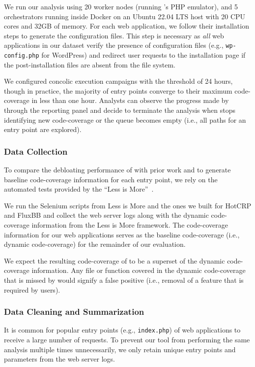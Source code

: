 We run our analysis using 20 worker nodes (running \animatedead{}'s PHP emulator), and 5 orchestrators running inside Docker on an Ubuntu 22.04 LTS host with 20 CPU cores and 32GB of memory. 
For each web application, we follow their installation steps to generate the configuration files. 
This step is necessary as \emph{all} web applications in our dataset verify the presence of configuration files (e.g., \texttt{wp-config.php} for WordPress) and redirect user requests to the installation page if the post-installation files are absent from the file system. 

We configured concolic execution campaigns with the threshold of 24 hours, though in practice, the majority of entry points converge to their maximum code-coverage in less than one hour. 
Analysts can observe the progress made by \animatedead{} through the reporting panel and decide to terminate the analysis when \animatedead{} stops identifying new code-coverage or the queue becomes empty (i.e., all paths for an entry point are explored). 

\subsubsection*{Data Collection} 
To compare the debloating performance of \animatedead{} with prior work and to generate baseline code-coverage information for each entry point, we rely on the automated tests provided by the ``Less is More''~\cite{azad2019less}. 

We run the Selenium scripts from Less is More and the ones we built for HotCRP and FluxBB and collect the web server logs along with the dynamic code-coverage information from the Less is More framework. 
The code-coverage information for our web applications serves as the baseline code-coverage (i.e., dynamic code-coverage) for the remainder of our evaluation. 

We expect the resulting code-coverage of \animatedead{} to be a superset of the dynamic code-coverage information. 
Any file or function covered in the dynamic code-coverage that is missed by \animatedead{} would signify a false positive (i.e., removal of a feature that is required by users). 

\subsubsection*{Data Cleaning and Summarization} 
It is common for popular entry points (e.g., \texttt{index.php}) of web applications to receive a large number of requests. 
To prevent our tool from performing the same analysis multiple times unnecessarily, we only retain unique entry points and parameters from the web server logs. 

